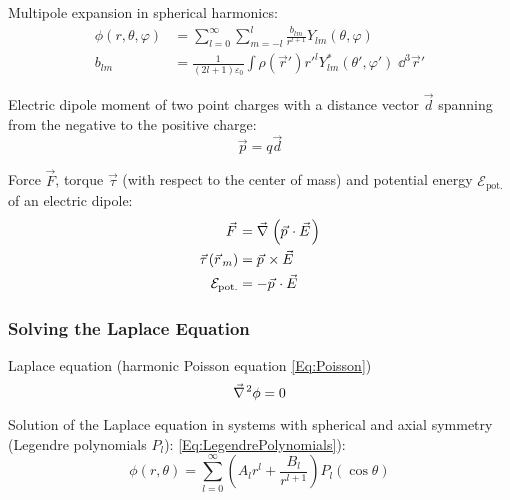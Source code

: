 			\noindent
			Multipole expansion in spherical harmonics:
			\begin{equation}
				\begin{aligned}
					\phi(r,\theta,\varphi) &= \sum_{l=0}^{\infty}\sum_{m=-l}^{l} \frac{b_{lm}}{r^{l+1}}Y_{lm}(\theta,\varphi) \\
					b_{lm} &= \frac{1}{(2l+1)\varepsilon_0}\int\rho(\vec{r}')r'^lY^{*}_{lm}(\theta',\varphi')\;\dd^3\vec{r}'
				\end{aligned}
			\end{equation}

			\noindent
			Electric dipole moment of two point charges with a distance vector $\vec{d}$ spanning from the negative to the positive charge:
			\begin{equation}
				\vec{p}=q\vec{d}
			\end{equation}

			\noindent
			Force $\vec{F}$, torque $\vec{\tau}$ (with respect to the center of mass) and potential energy $\mathcal{E}_\text{pot.}$ of an electric dipole:
			\begin{equation}
				\begin{aligned}
					\vec{F} &= \Nabla\left(\vec{p}\cdot\vec{E}\right) \\
					\vec{\tau}(\vec{r}_m) &= \vec{p}\times\vec{E} \\
					\mathcal{E}_\text{pot.} &= -\vec{p}\cdot\vec{E} \\
				\end{aligned}
			\end{equation}

		\subsubsection{Solving the Laplace Equation} \label{Sec:SolvingTheLaplaceEquation}
			\noindent
			Laplace equation (harmonic Poisson equation \ref{Eq:Poisson})
			\begin{equation}
				\Nabla^2 \phi = 0
			\end{equation}

			\noindent
			Solution of the Laplace equation in systems with spherical and axial symmetry (Legendre polynomials $P_l$): \ref{Eq:LegendrePolynomials}):
			\begin{equation}
				\phi(r,\theta)=\sum_{l=0}^\infty \left(A_l r^l + \frac{B_l}{r^{l+1}}\right)P_l(\cos\theta)
			\end{equation}


